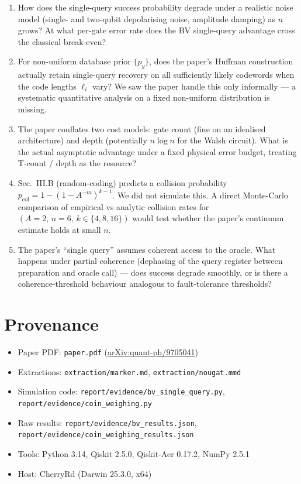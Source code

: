 \documentclass[11pt]{article}
\begin{document}
\begin{enumerate}
\item[\textbf{Q1}] How does the single-query success probability degrade under a
   realistic noise model (single- and two-qubit depolarising noise, amplitude
   damping) as $n$ grows? At what per-gate error rate does the BV
   single-query advantage cross the classical break-even?
\item[\textbf{Q2}] For non-uniform database prior $\{p_y\}$, does the paper's
   Huffman construction actually retain single-query recovery on all
   sufficiently likely codewords when the code lengths $\ell_i$ vary? We saw
   the paper handle this only informally --- a systematic quantitative
   analysis on a fixed non-uniform distribution is missing.
\item[\textbf{Q3}] The paper conflates two cost models: gate count (fine on an
   idealised architecture) and depth (potentially $n\log n$ for the Walsh
   circuit). What is the actual asymptotic advantage under a fixed physical
   error budget, treating T-count / depth as the resource?
\item[\textbf{Q4}] Sec.~III.B (random-coding) predicts a collision probability
   $p_\text{col}=1-(1-A^{-m})^{k-1}$. We did not simulate this. A direct
   Monte-Carlo comparison of empirical vs analytic collision rates for
   $(A=2,\, n=6,\, k\in\{4,8,16\})$ would test whether the paper's continuum
   estimate holds at small $n$.
\item[\textbf{Q5}] The paper's ``single query'' assumes coherent access to the
   oracle. What happens under partial coherence (dephasing of the query
   register between preparation and oracle call) --- does success degrade
   smoothly, or is there a coherence-threshold behaviour analogous to
   fault-tolerance thresholds?
\end{enumerate}

\section{Provenance}
\begin{itemize}
    \item Paper PDF: \verb|paper.pdf| (\href{https://arxiv.org/abs/quant-ph/9705041}{arXiv:quant-ph/9705041})
    \item Extractions: \verb|extraction/marker.md|, \verb|extraction/nougat.mmd|
    \item Simulation code: \verb|report/evidence/bv_single_query.py|,
          \verb|report/evidence/coin_weighing.py|
    \item Raw results: \verb|report/evidence/bv_results.json|,
          \verb|report/evidence/coin_weighing_results.json|
    \item Tools: Python 3.14, Qiskit 2.5.0, Qiskit-Aer 0.17.2, NumPy 2.5.1
    \item Host: CherryRd (Darwin 25.3.0, x64)
\end{itemize}
\end{document}
